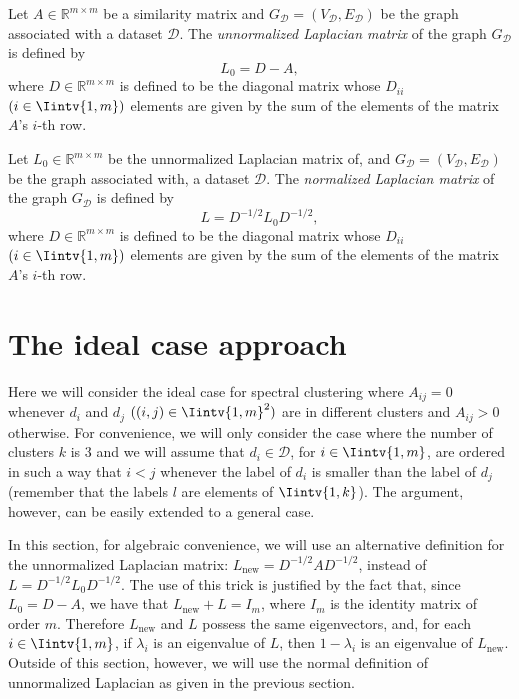 \begin{definition}
   Let $A \in \mathbb R ^{m \times m}$ be a similarity matrix and $G_{\mathcal D} = (V_{\mathcal D}, E_{\mathcal D})$ be the graph associated with a dataset $\mathcal D$. The \textit{unnormalized Laplacian matrix} of the graph $G_{\mathcal D}$ is defined by
   \begin{equation}
      L_0 = D - A,
   \end{equation}
   where $D \in \mathbb R ^{m \times m}$ is defined to be the diagonal matrix whose $D_{ii}$ $(i \in \Iintv{1,m})$ elements are given by the sum of the elements of the matrix $A$'s $i$-th row.  
\end{definition}

\begin{definition}\label{unnormalized}
   Let $L_0 \in \mathbb R ^{m \times m}$ be the unnormalized Laplacian matrix of, and $G_{\mathcal D} = (V_{\mathcal D}, E_{\mathcal D})$ be the graph associated with, a dataset $\mathcal D$. The \textit{normalized Laplacian matrix} of the graph $G_{\mathcal D}$ is defined by
   \begin{equation}
      L = D^{-1/2}L_0D^{-1/2},
   \end{equation}
   where $D \in \mathbb R ^{m \times m}$ is defined to be the diagonal matrix whose $D_{ii}$ $(i \in \Iintv{1,m})$ elements are given by the sum of the elements of the matrix $A$'s $i$-th row.  
\end{definition}

\section{The ideal case approach}
Here we will consider the ideal case for spectral clustering where $A_{ij} = 0$ whenever $d_i$ and $d_j$ $((i,j) \in \Iintv{1,m}^2)$ are in different clusters and $A_{ij} > 0$ otherwise.
For convenience, we will only consider the case where the number of clusters $k$ is $3$ and we will assume that $d_i \in \mathcal D$, for $i \in \Iintv{1,m}$, are ordered in such a way that $i < j$ whenever the label of $d_i$ is smaller than the label of $d_j$ (remember that the labels $l$ are elements of $\Iintv{1,k}$).
The argument, however, can be easily extended to a general case.

In this section, for algebraic convenience, we will use an alternative definition for the unnormalized Laplacian matrix: $L_{\text{new}} = D^{-1/2}AD^{-1/2}$, instead of $L = D^{-1/2}L_0D^{-1/2}$.
The use of this trick is justified by the fact that, since $L_0 = D - A$, we have that $L_{\text{new}} + L = I_m$, where $I_m$ is the identity matrix of order $m$.
Therefore $L_{\text{new}}$ and $L$ possess the same eigenvectors, and, for each $i \in \Iintv{1,m}$, if $\lambda _i$ is an eigenvalue of $L$, then $1 - \lambda _i$ is an eigenvalue of $L_{\text{new}}$. 
Outside of this section, however, we will use the normal definition of unnormalized Laplacian as given in the previous section.

